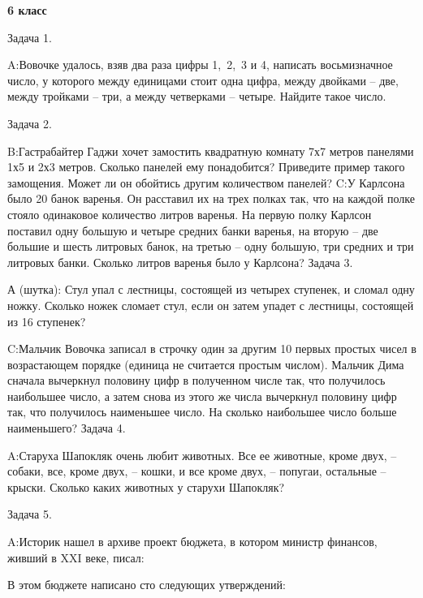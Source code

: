 \documentclass[11pt,a4paper,book]{ncc} \usepackage{modules/nonstahp_book}
\begin{document}
\medbreak\centerline{\bfseries 6 класс}\bigbreak\noindent

\bigbreak\noindent
Задача 1.\par\noindent
A:\qquad Вовочке удалось, взяв два раза цифры 1,\ 2,\ 3 и 4, написать восьмизначное число, у которого между единицами стоит одна цифра, между двойками -- две, между тройками -- три, а между четверками -- четыре. Найдите такое число.
\medbreak\noindent

\bigbreak\noindent Задача 2.\par\noindent

\medbreak\noindent
B:\qquad Гастрабайтер Гаджи хочет замостить квадратную комнату 7х7 метров панелями 1х5 и 2х3 метров. Сколько панелей ему понадобится? Приведите пример такого замощения. Может ли он обойтись другим количеством панелей?
\medbreak\noindent
C:\qquad  У Карлсона было 20 банок варенья. Он расставил их на трех полках так, что на каждой полке стояло одинаковое количество литров варенья. На первую полку Карлсон поставил одну большую и четыре средних банки варенья, на вторую --  две большие и шесть литровых банок, на третью -- одну большую, три средних и три литровых банки. Сколько литров варенья было у Карлсона?
\bigbreak\noindent
Задача 3.\par\noindent
А (шутка): \qquad Стул упал с лестницы, состоящей из четырех ступенек, и сломал одну ножку. Сколько ножек сломает стул, если он затем упадет с лестницы, состоящей из 16 ступенек?\medbreak\noindent

\medbreak\noindent
C:\qquad Мальчик Вовочка записал в строчку один за другим 10 первых простых чисел в возрастающем порядке (единица не считается простым числом). Мальчик Дима сначала вычеркнул половину цифр в полученном числе так, что получилось наибольшее число, а затем снова из этого же числа вычеркнул половину цифр так, что получилось наименьшее число.  На сколько наибольшее число больше наименьшего?
\bigbreak\noindent
Задача 4.\par\noindent
A:\qquad Старуха Шапокляк очень любит животных. Все ее животные, кроме двух, -- собаки, все, кроме двух, -- кошки, и все кроме двух, -- попугаи, остальные -- крыски. Сколько каких животных у старухи Шапокляк?
\medbreak\noindent

\bigbreak\noindent
Задача 5.\par\noindent
A:\qquad Историк  нашел в архиве проект бюджета, в котором министр финансов, живший в XXI веке, писал:\par
В этом бюджете написано сто следующих утверждений:
\end{document}
